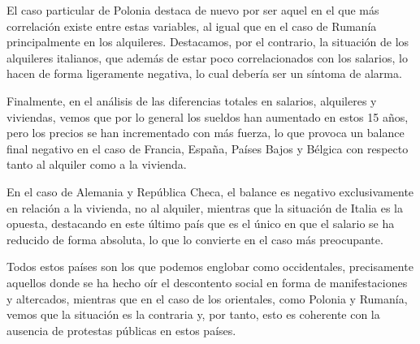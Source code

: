 \documentclass[water,article,submit,pdftex,moreauthors]{Definitions/mdpi}
\begin{document}
El caso particular de Polonia destaca de nuevo por ser aquel en el que
más correlación existe entre estas variables, al igual que en el caso de
Rumanía principalmente en los alquileres. Destacamos, por el contrario,
la situación de los alquileres italianos, que además de estar poco
correlacionados con los salarios, lo hacen de forma ligeramente
negativa, lo cual debería ser un síntoma de alarma.

Finalmente, en el análisis de las diferencias totales en salarios,
alquileres y viviendas, vemos que por lo general los sueldos han
aumentado en estos 15 años, pero los precios se han incrementado con más
fuerza, lo que provoca un balance final negativo en el caso de Francia,
España, Países Bajos y Bélgica con respecto tanto al alquiler como a la
vivienda.

En el caso de Alemania y República Checa, el balance es negativo
exclusivamente en relación a la vivienda, no al alquiler, mientras que
la situación de Italia es la opuesta, destacando en este último país que
es el único en que el salario se ha reducido de forma absoluta, lo que
lo convierte en el caso más preocupante.

Todos estos países son los que podemos englobar como occidentales,
precisamente aquellos donde se ha hecho oír el descontento social en
forma de manifestaciones y altercados, mientras que en el caso de los
orientales, como Polonia y Rumanía, vemos que la situación es la
contraria y, por tanto, esto es coherente con la ausencia de protestas
públicas en estos países.


\end{document}
